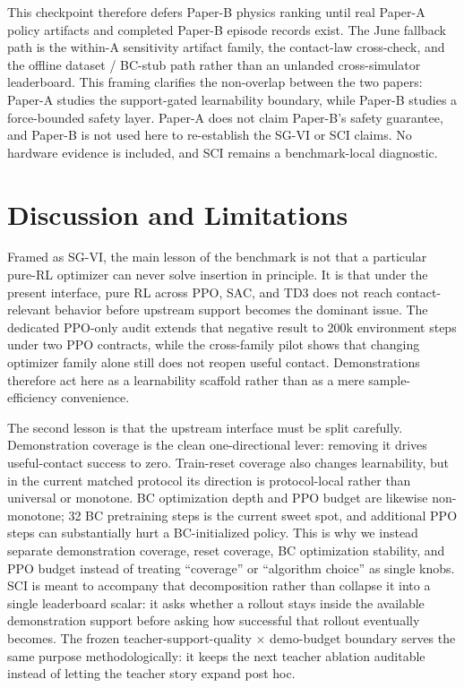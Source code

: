 ﻿\documentclass[11pt]{article}
\begin{document}
This checkpoint therefore defers Paper-B physics ranking until real Paper-A policy artifacts and
completed Paper-B episode records exist. The June fallback path is the within-A sensitivity
artifact family, the contact-law cross-check, and the offline dataset / BC-stub path rather than an
unlanded cross-simulator leaderboard. This framing clarifies the non-overlap between the two
papers: Paper-A studies the support-gated learnability boundary, while Paper-B studies a
force-bounded safety layer. Paper-A does not claim Paper-B's safety guarantee, and Paper-B is not
used here to re-establish the SG-VI or SCI claims. No hardware evidence is included, and SCI
remains a benchmark-local diagnostic.

\section{Discussion and Limitations}
\label{sec:discussion}

Framed as SG-VI, the main lesson of the benchmark is not that a particular pure-RL optimizer can
never solve insertion in principle. It is that under the present interface, pure RL across PPO,
SAC, and TD3 does not reach contact-relevant behavior before upstream support becomes the dominant
issue. The dedicated PPO-only audit extends that negative result to 200k environment steps under
two PPO contracts, while the cross-family pilot shows that changing optimizer family alone still
does not reopen useful contact. Demonstrations therefore act here as a learnability scaffold rather
than as a mere sample-efficiency convenience.

The second lesson is that the upstream interface must be split carefully. Demonstration coverage
is the clean one-directional lever: removing it drives useful-contact success to zero. Train-reset
coverage also changes learnability, but in the current matched protocol its direction is
protocol-local rather than universal or monotone. BC optimization depth and PPO budget are likewise
non-monotone; 32 BC pretraining steps is the current sweet spot, and additional PPO steps can
substantially hurt a BC-initialized policy. This is why we instead separate demonstration coverage,
reset coverage, BC optimization stability, and PPO budget instead of treating ``coverage'' or
``algorithm choice'' as single knobs. SCI is meant to accompany that decomposition rather than
collapse it into a single leaderboard scalar: it asks whether a rollout stays inside the available
demonstration support before asking how successful that rollout eventually becomes. The frozen
teacher-support-quality $\times$ demo-budget boundary serves the same purpose methodologically: it
keeps the next teacher ablation auditable instead of letting the teacher story expand post hoc.
\end{document}
